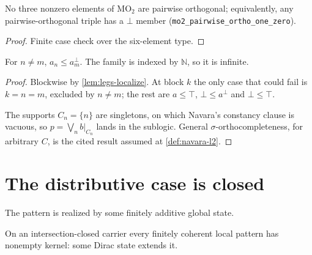 \begin{lemma}
  \label{lem:mo2-cap-two}
  \leanok
  No three nonzero elements of MO$_2$ are pairwise orthogonal; equivalently, any
  pairwise-orthogonal triple has a $\bot$ member
  (\texttt{mo2\_pairwise\_ortho\_one\_zero}).
\end{lemma}

\begin{proof}
  \leanok
  Finite case check over the six-element type.
\end{proof}

\begin{lemma}
  \label{lem:afam-ortho}
  \leanok
  For $n \ne m$, $a_n \le a_m^{\perp}$. The family is indexed by $\mathbb{N}$,
  so it is infinite.
\end{lemma}

\begin{proof}
  \leanok
  Blockwise by \ref{lem:legs-localize}. At block $k$ the only case that could
  fail is $k = n = m$, excluded by $n \ne m$; the rest are $a \le \top$,
  $\bot \le a^{\perp}$ and $\bot \le \top$.

  The supports $C_n = \{n\}$ are singletons, on which Navara's constancy clause
  is vacuous, so $p = \bigvee_n b|_{C_n}$ lands in the sublogic. General
  $\sigma$-orthocompleteness, for arbitrary $C$, is the cited result assumed at
  \ref{def:navara-l2}.
\end{proof}

\section{The distributive case is closed}

\begin{definition}
  \label{def:fincoherent}
  \leanok
  The pattern is realized by some finitely additive global state.
\end{definition}

\begin{theorem}
  \label{thm:boolean-baseline}
  \leanok
  On an intersection-closed carrier every finitely coherent local pattern has
  nonempty kernel: some Dirac state extends it.
\end{theorem}

